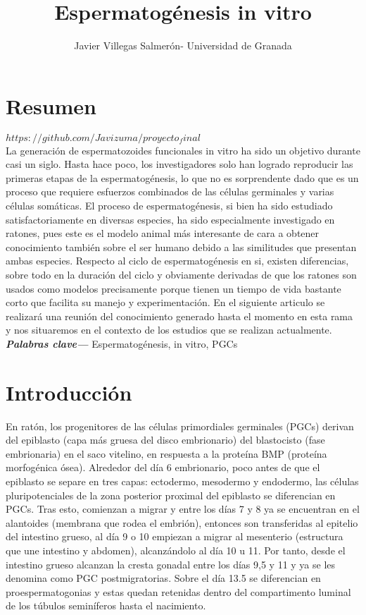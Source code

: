 \documentclass[a4paper,11pt]{article}
\providecommand{\keywords}[1]{\textbf{\textit{Palabras clave---}} #1}
\begin{document}
\title{Espermatogénesis in vitro}
\author{Javier Villegas Salmerón- Universidad de Granada}
\maketitle
\section{Resumen}
$https://github.com/Javizuma/proyecto_final$\\
La generación de espermatozoides funcionales in vitro ha sido un objetivo durante casi un siglo. Hasta hace poco, los investigadores solo han logrado reproducir las primeras etapas de la espermatogénesis, lo que no es sorprendente dado que es un proceso que requiere esfuerzos combinados de las células germinales y varias células somáticas.
El proceso de espermatogénesis, si bien ha sido estudiado satisfactoriamente en diversas especies, ha sido especialmente investigado en ratones, pues este es el modelo animal  más interesante de cara a obtener conocimiento también sobre el ser humano debido a las similitudes que presentan ambas especies. Respecto al ciclo de espermatogénesis en si, existen diferencias, sobre todo en la duración del ciclo y obviamente derivadas de que los ratones son usados como modelos  precisamente porque tienen un tiempo de vida bastante corto que facilita su manejo y experimentación. 
En el siguiente articulo se realizará una reunión del conocimiento generado hasta el momento en esta rama y nos situaremos en el contexto de los estudios que se realizan actualmente. 
\keywords{Espermatogénesis, in vitro, PGCs}
\section{Introducción}
En ratón, los progenitores de las células primordiales germinales (PGCs) derivan del epiblasto (capa más gruesa del disco embrionario) del blastocisto (fase embrionaria) en el saco vitelino, en respuesta a la proteína BMP (proteína morfogénica ósea). Alrededor del día 6 embrionario, poco antes de que el epiblasto se separe en tres capas: ectodermo, mesodermo y endodermo, las células pluripotenciales de la zona posterior proximal del epiblasto se diferencian en PGCs. Tras esto, comienzan a migrar y entre los días 7 y 8 ya se encuentran en el alantoides (membrana que rodea el embrión), entonces son transferidas al epitelio del intestino grueso,  al día 9 o 10 empiezan a migrar al mesenterio (estructura que une intestino y abdomen), alcanzándolo al día 10 u 11. Por tanto, desde el intestino grueso alcanzan la cresta gonadal entre los días 9,5 y 11 y ya se les denomina como PGC postmigratorias. Sobre el día 13.5 se diferencian en proespermatogonias y estas quedan retenidas dentro del compartimento luminal de los túbulos seminíferos hasta el nacimiento. 
\end{document}
